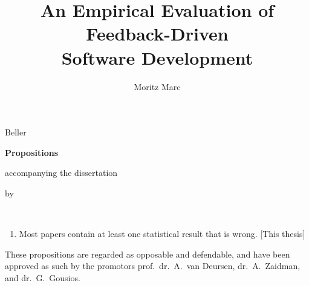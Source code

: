 \documentclass{propositions}
\begin{document}
\title{An Empirical Evaluation of Feedback-Driven \\Software Development}
\author{Moritz Marc}{Beller}

\begin{center}

{\Large\titlefont\bfseries Propositions}

\medskip

accompanying the dissertation

\medskip

{\makeatletter
\titlestyle\bfseries\large\@title
\makeatother}

{\makeatletter
\ifx\@subtitle\undefined\else
    \titlefont\titleshape\@subtitle
\fi
\makeatother}

\medskip

by

\medskip

\makeatletter
{\large\titlefont\bfseries\@firstname\ {\titleshape\@lastname}}
\makeatother

\end{center}

\bigskip

\begin{enumerate}
\item Most papers contain at least one statistical result that is wrong. [This
  thesis]
\end{enumerate}

\bigskip
\bigskip

\begin{center}
These propositions are regarded as opposable and defendable, and have been approved as such by the
promotors prof.\ dr.\ A.\ van Deursen, dr.\ A.\ Zaidman, and dr.\ G.\ Gousios.
\end{center}





\end{document}
